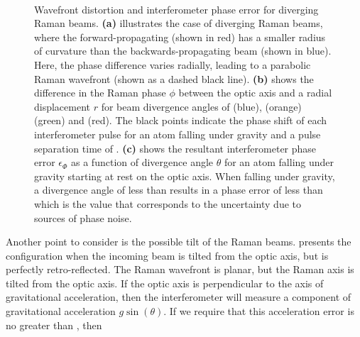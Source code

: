 \begin{figure}[!htbp]
	\centering
	\def\svgwidth{\columnwidth}
  \subfloat[][]{\scalebox{0.3}{\label{fig:retro_divergence}}}
	\\
	\caption[Wavefront distortion and interferometer phase error for
  diverging Raman beams.]{Wavefront distortion and interferometer phase error for
    diverging Raman beams. \textbf{(a)} illustrates the case of
    diverging Raman beams, where the forward-propagating (shown in
    red) has a smaller radius of curvature than the
    backwards-propagating beam (shown in blue). Here, the phase
    difference varies radially, leading to a parabolic Raman wavefront
    (shown as a dashed black line). \textbf{(b)} shows the difference in the
  Raman phase $\phi$ between the optic axis and a radial displacement $r$ for
  beam divergence angles of
		 (blue),  (orange)
		 (green) and
     (red). The black points indicate the
    phase shift of each interferometer pulse for an atom falling under
    gravity and a pulse separation time of .
    \textbf{(c)} shows the resultant
    interferometer phase error $\epsilon_\Phi$ as a function of
    divergence angle $\theta$ for an atom falling under gravity
    starting at rest on the optic axis. When falling under gravity, a divergence angle of less than
     results in a phase error of less
    than  which is the value that
    corresponds to the uncertainty due to sources of phase noise. 
		}\label{fig:collimation_error_plots}
\end{figure}
\par\noindent
Another point to consider is the possible tilt of the Raman beams. 
presents the configuration when the incoming beam is tilted from the
optic axis, but is perfectly retro-reflected. The Raman wavefront is
planar, but the Raman axis is tilted from the optic axis. If the optic
axis is perpendicular to the axis of gravitational
acceleration, then the interferometer will measure a component of
gravitational acceleration $g \sin(\theta)$. If we require that this
acceleration error is no greater than , then
